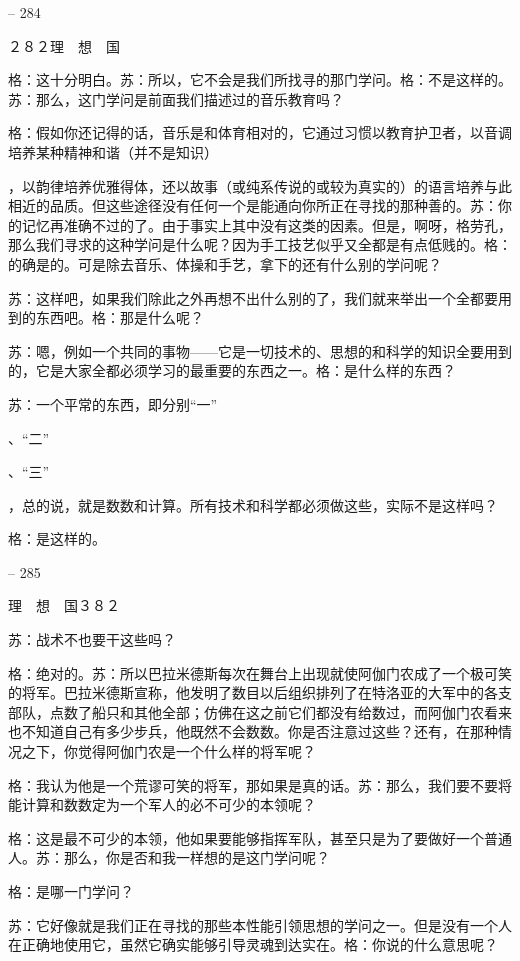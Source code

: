 \documentclass[11pt,oneside]{book}
\begin{document}
\begin{common-format}
-- 284

    ２８２理　想　国

    格：这十分明白。苏：所以，它不会是我们所找寻的那门学问。格：不是这样的。苏：那么，这门学问是前面我们描述过的音乐教育吗？

    格：假如你还记得的话，音乐是和体育相对的，它通过习惯以教育护卫者，以音调培养某种精神和谐（并不是知识）

    ，以韵律培养优雅得体，还以故事（或纯系传说的或较为真实的）的语言培养与此相近的品质。但这些途径没有任何一个是能通向你所正在寻找的那种善的。苏：你的记忆再准确不过的了。由于事实上其中没有这类的因素。但是，啊呀，格劳孔，那么我们寻求的这种学问是什么呢？因为手工技艺似乎又全都是有点低贱的。格：的确是的。可是除去音乐、体操和手艺，拿下的还有什么别的学问呢？

    苏：这样吧，如果我们除此之外再想不出什么别的了，我们就来举出一个全都要用到的东西吧。格：那是什么呢？

    苏：嗯，例如一个共同的事物——它是一切技术的、思想的和科学的知识全要用到的，它是大家全都必须学习的最重要的东西之一。格：是什么样的东西？

    苏：一个平常的东西，即分别“一”

    、“二”

    、“三”

    ，总的说，就是数数和计算。所有技术和科学都必须做这些，实际不是这样吗？

    格：是这样的。

    

-- 285

    理　想　国３８２

    苏：战术不也要干这些吗？

    格：绝对的。苏：所以巴拉米德斯每次在舞台上出现就使阿伽门农成了一个极可笑的将军。巴拉米德斯宣称，他发明了数目以后组织排列了在特洛亚的大军中的各支部队，点数了船只和其他全部；仿佛在这之前它们都没有给数过，而阿伽门农看来也不知道自己有多少步兵，他既然不会数数。你是否注意过这些？还有，在那种情况之下，你觉得阿伽门农是一个什么样的将军呢？

    格：我认为他是一个荒谬可笑的将军，那如果是真的话。苏：那么，我们要不要将能计算和数数定为一个军人的必不可少的本领呢？

    格：这是最不可少的本领，他如果要能够指挥军队，甚至只是为了要做好一个普通人。苏：那么，你是否和我一样想的是这门学问呢？

    格：是哪一门学问？

    苏：它好像就是我们正在寻找的那些本性能引领思想的学问之一。但是没有一个人在正确地使用它，虽然它确实能够引导灵魂到达实在。格：你说的什么意思呢？


\end{common-format}
\end{document}
